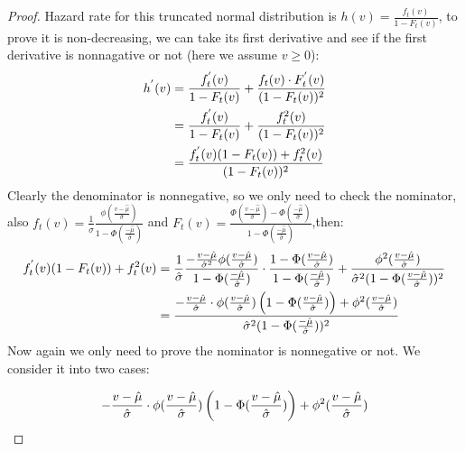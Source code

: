 \begin{proof}
Hazard rate for this truncated normal distribution is $h(v) = \frac{f_t(v)}{1 - F_t(v)}$, to prove it is non-decreasing, we can take its first derivative and see if the first derivative is nonnagative or not (here we assume $v \geqslant 0$):
\begin{equation}\notag
\begin{split}	
	h^{'}(v) &=\frac{f_t^{'}(v)}{1 - F_t(v)}  + \frac{f_t(v)\cdot F_t^{'} (v)}{(1 - F_t(v))^2}\\&= \frac{f_t^{'}(v)}{1 - F_t(v)}  + \frac{f_t^{2}(v)}{(1 - F_t(v))^2} \\&=\frac{ f_t^{'}(v)(1 - F_t(v)) + f_t^{2}(v)}{(1 - F_t(v))^2}
\end{split}
\end{equation} 
Clearly the denominator is nonnegative, so we only need to check the nominator, also $f_t(v) = \frac{1}{\hat{\sigma}} \frac{\phi(\frac{v-\hat{\mu}}{\hat{\sigma}})}{1 - \Phi(\frac{-\hat{\mu}}{\hat{\sigma}})}$ and $F_t(v) =  \frac{\Phi(\frac{v-\hat{\mu}}{\hat{\sigma}}) - \Phi(\frac{-\hat{\mu}}{\hat{\sigma}})}{1 - \Phi(\frac{-\hat{\mu}}{\hat{\sigma}})}  $,then:
\begin{equation}\notag
	\begin{split}	
		f_t^{'}(v)(1 - F_t(v)) + f_t^{2}(v)&=\frac{1}{\hat{\sigma}} \frac{-\frac{v-\hat{\mu}}{\hat{\sigma}^2}\phi(\frac{v-\hat{\mu}}{\hat{\sigma}})}{1 - \Phi(\frac{-\hat{\mu}}{\hat{\sigma}})} \cdot \frac{1 - \Phi(\frac{v-\hat{\mu}}{\hat{\sigma}})}{1 - \Phi(\frac{-\hat{\mu}}{\hat{\sigma}})} + \frac{\phi^2(\frac{v-\hat{\mu}}{\hat{\sigma}})}{\hat{\sigma}^2 (1 - \Phi(\frac{v-\hat{\mu}}{\hat{\sigma}}))^2} \\&= \frac{-\frac{v-\hat{\mu}}{\hat{\sigma}}\cdot \phi(\frac{v-\hat{\mu}}{\hat{\sigma}})\left(1 - \Phi(\frac{v-\hat{\mu}}{\hat{\sigma}})\right) + \phi^2(\frac{v-\hat{\mu}}{\hat{\sigma}})}{\hat{\sigma}^2 (1 - \Phi(\frac{-\hat{\mu}}{\hat{\sigma}}))^2}
	\end{split}
\end{equation} 
Now again we only need to prove the nominator is nonnegative or not. We consider it into two cases:

\begin{equation}\notag
	\begin{split}		
		-\frac{v-\hat{\mu}}{\hat{\sigma}}\cdot \phi(\frac{v-\hat{\mu}}{\hat{\sigma}})\left(1 - \Phi(\frac{v-\hat{\mu}}{\hat{\sigma}})\right) + \phi^2(\frac{v-\hat{\mu}}{\hat{\sigma}})
	\end{split}
\end{equation} 


\end{proof}
